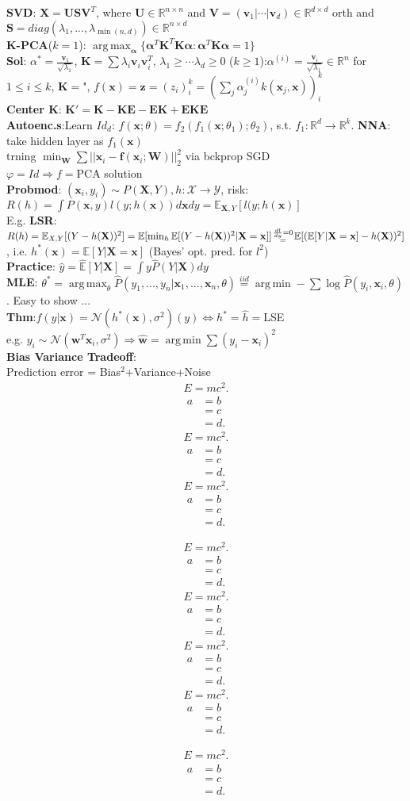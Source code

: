 \documentclass[11pt]{article}
\newcommand\TestText{%
\lipsum[4]
\begin{gather*}
E = mc^2.
\end{gather*}
\lipsum[4]
\begin{align*}
a &= b \\
&= c \\
&= d.
\end{align*}
}
\newcommand{\bv}[1]{\mathbf{#1}}
\newcommand{\est}[1]{\mathbf{\hat{#1}}}
\newcommand{\R}{\mathbb{R}}
\newcommand{\E}{\mathbb{E}}
\DeclareMathOperator*{\argmax}{arg\,max}
\DeclareMathOperator*{\argmin}{arg\,min}
\begin{document}
\begin{multicols}{4}
\textbf{SVD}: $\bv{X}=\bv{USV}^T$, where $\bv{U}\in\R^{n\times n}$ and $\bv{V}=(\bv{v}_1|\cdots|\bv{v}_d)\in\R^{d\times d}$ orth and $\bv{S}=diag(\lambda_1,...,\lambda_{\min(n,d)})\in\R^{n\times d}$\\
\textbf{K-PCA}($k=1$): $\argmax_{\bv{\alpha}} \{\bv{\alpha}^T\bv{K}^T\bv{K}\bv{\alpha}:\bv{\alpha}^T\bv{K}\bv{\alpha}=1\}$\\
\textbf{Sol}: $\alpha^*=\frac{\bv{v}_1}{\sqrt{\lambda_1}}$, $\bv{K}=\sum\lambda_i\bv{v}_i\bv{v}_i^T$, $\lambda_1\geq\cdots\lambda_d\geq0$
($k\geq1$):$\alpha^{(i)}=\frac{\bv{v}_i}{\sqrt{\lambda_1}}\in\R^n$ for $1\leq i\leq k$, $\bv{K}=$", $f(\bv{x})=\bv{z}=(z_i)^k_i=(\sum_j\alpha_j^{(i)}k(\bv{x}_j,\bv{x}))^k_i$\\
\textbf{Center K}: $\bv{K}'=\bv{K}-\bv{KE}-\bv{EK}+\bv{EKE}$\\
\textbf{Autoenc.s}:Learn $Id_d$: $f(\bv{x};\theta)=f_2(f_1(\bv{x};\theta_1);\theta_2)$, s.t. $f_1:\R^d\rightarrow\R^k$. \textbf{NNA}: take hidden layer as $f_1(\bv{x})$\\
trning $\min_{\bv{W}}\sum||\bv{x}_i-\bv{f}(\bv{x}_i;\bv{W})||^2_2$ via bckprop SGD\\
$\varphi=Id\Rightarrow f=$PCA solution\\
\textbf{Probmod}: $(\bv{x}_i,y_i)\sim P(\bv{X},Y),h:\mathcal{X}\rightarrow\mathcal{Y}$, risk: $R(h)=\int P(\bv{x},y)l(y;h(\bv{x}))d\bv{x}dy=\E_{\bv{X},Y}[l(y;h(\bv{x})]$\\
E.g. \textbf{LSR}: $R(h)=\E_{X,Y}[(Y-h(\bv{X}))^2]=\E[\min_h\E[(Y-h(\bv{X}))^2|\bv{X}=\bv{x}]]\genfrac{}{}{0pt}{}{\frac{dl}{dy}=0}{=}\E[(\E[Y|\bv{X}=\bv{x}]-h(\bv{X}))^2]$, i.e. $h^*(\bv{x})=\E[Y|\bv{X}=\bv{x}]$ (Bayes' opt. pred. for $l^2$)\\
\textbf{Practice}: $\hat{y}=\hat{\E}[Y|\bv{X}]=\int y\hat{P}(Y|\bv{X})dy$\\
\textbf{MLE}: $\theta^*=\argmax_\theta\hat{P}(y_1,...,y_n|\bv{x}_1,...,\bv{x}_n,\theta)\stackrel{iid}{=}\argmin-\sum\log\hat{P}(y_i,\bv{x}_i,\theta)$. Easy to show ...\\
\textbf{Thm}:$f(y|\bv{x})=\mathcal{N}(h^*(\bv{x}),\sigma^2)(y)\iff h^*=\hat{h}=$LSE\\
e.g. $y_i\sim\mathcal{N}(\bv{w}^T\bv{x}_i,\sigma^2)\Rightarrow\est{w}=\argmin\sum(y_i-\bv{x}_i)^2$\\
\textbf{Bias Variance Tradeoff}:\\
Prediction error = Bias$^2$+Variance+Noise\\




\TestText\TestText\TestText
\TestText\TestText\TestText\TestText
\TestText\
\end{multicols}
\end{document}

